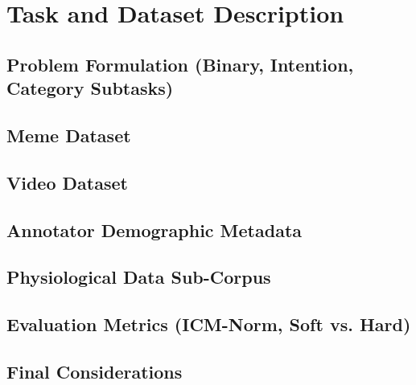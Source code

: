 \chapter{Task and Dataset Description}\label{cap:metodology}

\section{Problem Formulation (Binary, Intention, Category Subtasks)}\label{sec:problem-formulation}

\section{Meme Dataset}\label{sec:meme-dataset}

\section{Video Dataset}\label{sec:video-dataset}

\section{Annotator Demographic Metadata}\label{sec:annotator-demographic-metadata}

\section{Physiological Data Sub-Corpus}\label{sec:physiological-data-sub-corpus}

\section{Evaluation Metrics (ICM-Norm, Soft vs. Hard)}\label{sec:evaluation-metrics}

\section{Final Considerations}\label{sec:cap03-final-considerations}
